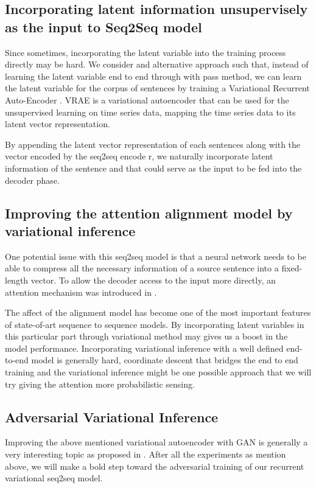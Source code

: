 \documentclass{article}
\begin{document}
\subsection{Incorporating latent information unsupervisely as the input to Seq2Seq model}
Since sometimes, incorporating the latent variable into the training process directly may be hard. We consider and alternative approach such that, instead of learning the latent variable end to end through with pass method, we can learn the latent variable for the corpus of sentences by training a Variational Recurrent Auto-Encoder \cite{vrae}. VRAE is a variational autoencoder that can be used for the unsupervised learning on time series data, mapping the time series data to its latent vector representation.

By appending the latent vector representation of each sentences along with the vector encoded by the seq2seq encode r, we naturally incorporate latent information of the sentence and that could serve as the input to be fed into the decoder phase.

\subsection{Improving the attention alignment model by variational inference }

One potential issue with this seq2seq model is that a neural network needs to be able to compress all the necessary information of a source sentence into a fixed-length vector. To allow the decoder access to the input more directly, an attention mechanism was introduced in \cite{attention}.

The affect of the alignment model has become one of the most important features of state-of-art sequence to sequence models. By incorporating latent variables in this particular part through variational method may gives us a boost in the model performance. Incorporating variational inference with a well defined end-to-end model is generally hard, coordinate descent that bridges the end to end training and the variational inference might be one possible approach that we will try giving the attention more probabilistic sensing.

\subsection{Adversarial Variational Inference}
Improving the above mentioned variational autoencoder with GAN is generally a very interesting topic as proposed in \cite{aae}. After all the experiments as mention above, we will make a bold step toward the adversarial training of our recurrent variational seq2seq model.



\end{document}
